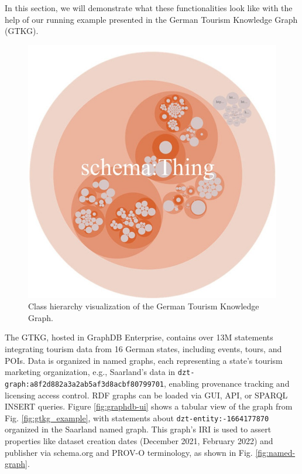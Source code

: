 \documentclass[12pt]{article}
\begin{document}
In this section, we will demonstrate what these functionalities look like with the help of our running example presented in the German Tourism Knowledge Graph (GTKG).
\begin{figure}
    \includegraphics[width=\linewidth]{imgs/19.8.jpeg}
    \caption{Class hierarchy visualization of the German Tourism Knowledge Graph.}
    \label{fig:class-hierarchy-example}
\end{figure}

The GTKG, hosted in GraphDB Enterprise, contains over 13M statements integrating tourism data from 16 German states, including events, tours, and POIs. Data is organized in named graphs, each representing a state’s tourism marketing organization, e.g., Saarland’s data in \verb|dzt-graph:a8f2d882a3a2ab5af3d8acbf80799701|, enabling provenance tracking and licensing access control. RDF graphs can be loaded via GUI, API, or SPARQL INSERT queries. Figure \ref{fig:graphdb-ui} shows a tabular view of the graph from Fig. \ref{fig:gtkg_example}, with statements about \verb|dzt-entity:-1664177870| organized in the Saarland named graph. This graph’s IRI is used to assert properties like dataset creation dates (December 2021, February 2022) and publisher via schema.org and PROV-O terminology, as shown in Fig. \ref{fig:named-graph}.
\end{document}
